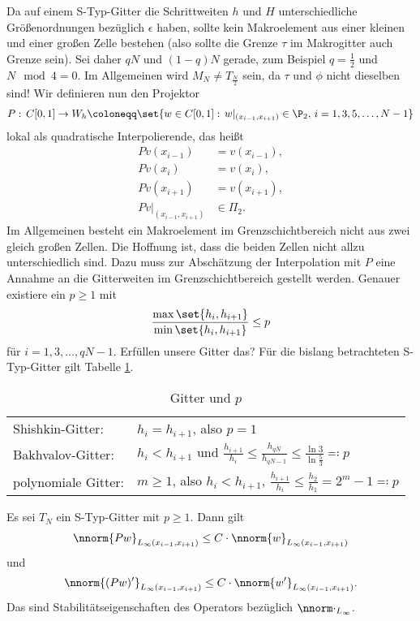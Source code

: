 Da auf einem S-Typ-Gitter die Schrittweiten $h$ und $H$ unterschiedliche Größenordnungen bezüglich $\epsilon$ haben, sollte kein Makroelement aus einer kleinen und einer großen Zelle bestehen (also sollte die Grenze $\tau$ im Makrogitter auch Grenze sein). Sei daher $qN$ und $(1-q)N$ gerade, zum Beispiel $q = \frac 12$ und $N \mod 4 = 0$. Im Allgemeinen wird $M_{N} \neq T_{\frac N 2}$ sein, da $\tau$ und $\phi$ nicht dieselben sind! Wir definieren nun den Projektor
\begin{align*}
  P: \, C[0, 1] \to W_{h} \coloneqq \set{w \in C[0, 1]: \, w|_{(x_{i-1}, x_{i+1})} \in \P_{2}, \, i = 1, 3, 5, \dots, N-1}
\end{align*}
lokal als quadratische Interpolierende, das heißt
\begin{align*}
  Pv(x_{i-1}) &= v(x_{i-1}),\\
  Pv(x_{i}) &= v(x_{i}),\\
  Pv(x_{i+1}) &= v(x_{i+1}),\\
  Pv|_{(x_{i-1}, x_{i+1})} &\in \Pi_{2}.
\end{align*}
Im Allgemeinen besteht ein Makroelement im Grenzschichtbereich nicht aus zwei gleich großen Zellen. Die Hoffnung ist, dass die beiden Zellen nicht allzu unterschiedlich sind. Dazu muss zur Abschätzung der Interpolation mit $P$ eine Annahme an die Gitterweiten im Grenzschichtbereich gestellt werden. Genauer existiere ein $p\geq 1$ mit
\begin{align*}
  \frac{\max \set{h_{i}, h_{i+1}}}{\min \set{h_{i}, h_{i+1}}}\leq p
\end{align*}
für $i = 1, 3, \dots, qN - 1$. Erfüllen unsere Gitter das? Für die bislang betrachteten S-Typ-Gitter gilt Tabelle \ref{tab:gitter_u_h}. 
\begin{table}[h!]
  \centering
  \begin{tabular}[h!]{l l}
    Shishkin-Gitter: & $h_{i} = h_{i+1}$, also $p = 1$\\
    Bakhvalov-Gitter: & $h_{i} < h_{i+1}$ und $\frac{h_{i+1}}{h_{i}} \leq \frac{h_{qN}}{h_{qN-1}} \leq \frac{\ln 3}{\ln \frac 53} \eqqcolon p$\\
    polynomiale Gitter: & $m \geq 1$, also $h_{i}< h_{i+1}$, $\frac{h_{i+1}}{h_{i}} \leq \frac{h_{2}}{h_{1}} = 2^{m} -1 \eqqcolon p$
  \end{tabular}
  \caption{Gitter und $p$}
  \label{tab:gitter_u_h}
\end{table}
\begin{lemma}\label{lem:6-17}
  Es sei $T_{N}$ ein S-Typ-Gitter mit $p\geq 1$. Dann gilt
  \begin{align*}
    \nnorm{Pw}_{L_{\infty}(x_{i-1}, x_{i+1})} \leq C \cdot\nnorm{w}_{L_{\infty}(x_{i-1}, x_{i+1})}
  \end{align*}
  und
  \begin{align*}
    \nnorm{(Pw)'}_{L_{\infty}(x_{i-1}, x_{i+1})} \leq C \cdot\nnorm{w'}_{L_{\infty}(x_{i-1}, x_{i+1})}. 
  \end{align*}
  Das sind Stabilitätseigenschaften des Operators bezüglich $\nnorm \cdot_{L_{\infty}}$. %
\end{lemma}
